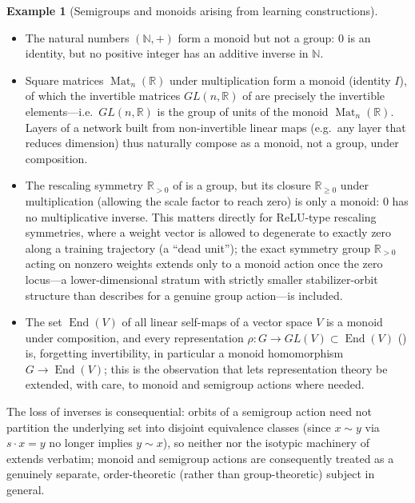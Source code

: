 \documentclass[11pt]{article}
\theoremstyle{plain}
\theoremstyle{definition}
\newtheorem{Example}{Example}[section]
\begin{document}
\begin{Example}[Semigroups and monoids arising from learning constructions]
\label{ex:semigroups-in-learning}
\begin{itemize}
    \item The natural numbers $(\mathbb{N}, +)$ form a monoid but not a
    group: $0$ is an identity, but no positive integer has an additive
    inverse in $\mathbb{N}$.
    \item Square matrices $\operatorname{Mat}_n(\mathbb{R})$ under multiplication
    form a monoid (identity $I$), of which the invertible matrices
    $GL(n,\mathbb{R})$ of  are precisely the
    invertible elements---i.e.\ $GL(n,\mathbb{R})$ is the group of units of
    the monoid $\operatorname{Mat}_n(\mathbb{R})$. Layers of a network built from
    non-invertible linear maps (e.g.\ any layer that reduces dimension) thus
    naturally compose as a monoid, not a group, under composition.
    \item The rescaling symmetry $\mathbb{R}_{>0}$ of
     is a group, but its closure
    $\mathbb{R}_{\geq 0}$ under multiplication (allowing the scale factor to
    reach zero) is only a monoid: $0$ has no multiplicative inverse. This
    matters directly for ReLU-type rescaling symmetries, where a weight
    vector is allowed to degenerate to exactly zero along a training
    trajectory (a ``dead unit''); the exact symmetry group
    $\mathbb{R}_{>0}$ acting on nonzero weights extends only to a
    monoid action once the zero locus---a lower-dimensional stratum with
    strictly smaller stabilizer-orbit structure than
     describes for a genuine group
    action---is included.
    \item The set $\operatorname{End}(V)$ of all linear self-maps of a vector
    space $V$ is a monoid under composition, and every representation
    $\rho: G \to GL(V) \subset \operatorname{End}(V)$
    () is, forgetting
    invertibility, in particular a monoid homomorphism $G \to
    \operatorname{End}(V)$; this is the observation that lets representation
    theory be extended, with care, to monoid and semigroup actions where
    needed.
\end{itemize}
\end{Example}

The loss of inverses is consequential: orbits of a semigroup action need not
partition the underlying set into disjoint equivalence classes (since
$x \sim y$ via $s \cdot x = y$ no longer implies $y \sim x$), so neither
 nor the isotypic machinery of
 extends verbatim; monoid and
semigroup actions are consequently treated as a genuinely separate,
order-theoretic (rather than group-theoretic) subject in general.
\end{document}
